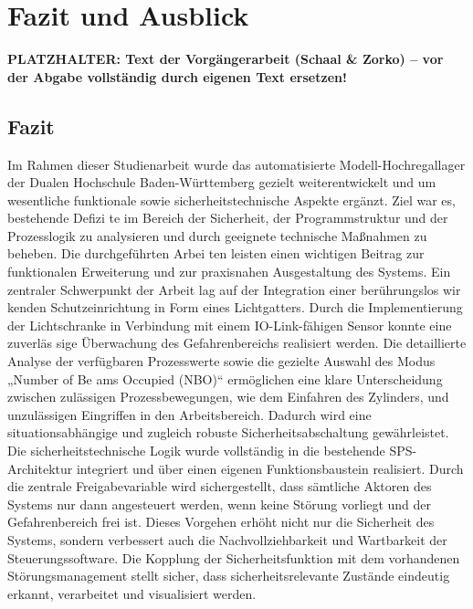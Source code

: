 \section{Fazit und Ausblick}

\noindent\colorbox{red!15}{\parbox{\dimexpr\textwidth-2\fboxsep}{\textbf{\color{red}PLATZHALTER: Text der Vorgängerarbeit (Schaal \& Zorko) – vor der Abgabe vollständig durch eigenen Text ersetzen!}}}

\subsection{Fazit}
Im Rahmen dieser Studienarbeit wurde das automatisierte Modell-Hochregallager der
Dualen Hochschule Baden-Württemberg gezielt weiterentwickelt und um wesentliche
funktionale sowie sicherheitstechnische Aspekte ergänzt. Ziel war es, bestehende Defizi
te im Bereich der Sicherheit, der Programmstruktur und der Prozesslogik zu analysieren
und durch geeignete technische Maßnahmen zu beheben. Die durchgeführten Arbei
ten leisten einen wichtigen Beitrag zur funktionalen Erweiterung und zur praxisnahen
Ausgestaltung des Systems.
Ein zentraler Schwerpunkt der Arbeit lag auf der Integration einer berührungslos wir
kenden Schutzeinrichtung in Form eines Lichtgatters. Durch die Implementierung der
Lichtschranke in Verbindung mit einem IO-Link-fähigen Sensor konnte eine zuverläs
sige Überwachung des Gefahrenbereichs realisiert werden. Die detaillierte Analyse
der verfügbaren Prozesswerte sowie die gezielte Auswahl des Modus „Number of Be
ams Occupied (NBO)“ ermöglichen eine klare Unterscheidung zwischen zulässigen
Prozessbewegungen, wie dem Einfahren des Zylinders, und unzulässigen Eingriffen
in den Arbeitsbereich. Dadurch wird eine situationsabhängige und zugleich robuste
Sicherheitsabschaltung gewährleistet.
Die sicherheitstechnische Logik wurde vollständig in die bestehende SPS-Architektur
integriert und über einen eigenen Funktionsbaustein realisiert. Durch die zentrale
Freigabevariable wird sichergestellt, dass sämtliche Aktoren des Systems nur dann
angesteuert werden, wenn keine Störung vorliegt und der Gefahrenbereich frei ist.
Dieses Vorgehen erhöht nicht nur die Sicherheit des Systems, sondern verbessert
auch die Nachvollziehbarkeit und Wartbarkeit der Steuerungssoftware. Die Kopplung
der Sicherheitsfunktion mit dem vorhandenen Störungsmanagement stellt sicher, dass
sicherheitsrelevante Zustände eindeutig erkannt, verarbeitet und visualisiert werden.
